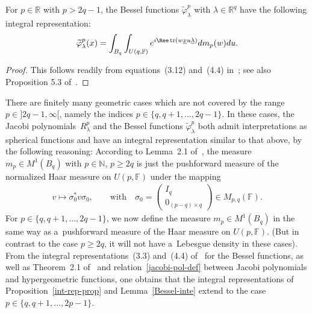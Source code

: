 \begin{Lemma}
\label{Bessel-inte}
For $p\in \mathbb R$ with $p>2q-1$, the Bessel functions $\widetilde\varphi_\lambda^{p}$ with $\lambda \in \mathbb R^q$
have the following integral representation:
\begin{gather}
\label{int-rep-Bessel}
\widetilde\varphi_\lambda^{p}(x)=\int_{B_q}\int_{U(q,\mathbb F)} e^{i\Ree \operatorname{tr}(w \underline x u \underline\lambda)}dm_p(w)du.
\end{gather}
\end{Lemma}

\begin{proof}
This follows readily from equations~(3.12) and~(4.4) in~\cite{R1}; see also Proposition 5.3 of~\cite{RV2}.
\end{proof}

\begin{Remark}
\label{group}
There are f\/initely many geometric cases which are not covered by the range $p\in{}]2q-1,\infty[$, namely the indices
$p\in\{q, q+1, \ldots, 2q-1\}$. In these cases, the Jacobi polyno\-mials~$R_\lambda^p $ and the Bessel functions
$\widetilde\varphi_\lambda^{p}$ both admit interpretations as spherical functions and have an integral representation
similar to that above, by the following reasoning: According to Lemma~2.1 of~\cite{R2}, the measure $m_p\in M^1(B_q)$
with $p\in \mathbb N$, $p\geq 2q$ is just the pushforward measure of the normalized Haar measure on $U(p,\mathbb F)$ under
the mapping
\begin{gather*}
v\mapsto \sigma_0^* v\sigma_0,
\qquad
\text{with}
\quad
\sigma_0=
\begin{pmatrix}
I_q
\\
0_{(p-q)\times q}
\end{pmatrix}
\in M_{p,q}(\mathbb F).
\end{gather*}
For $p\in \{q, q+1, \ldots, 2q-1\}$, we now def\/ine the measure $m_p\in M^1(B_q)$ in the same way as a~pushforward
measure of the Haar measure on $U(p, \mathbb F)$. (But in contrast to the case $p\geq 2q$, it will not have a~Lebesgue
density in these cases).
From the integral representa\-tions~(3.3) and~(4.4) of~\cite{R1} for the Bessel functions, as well as Theorem~2.1
of~\cite{RV2} and relation~\eqref{jacobi-pol-def} between Jacobi polynomials and hypergeometric functions, one obtains
that the integral representations of Proposition~\ref{int-rep-prop} and Lemma~\ref{Bessel-inte} extend
to the case $p\in\{q, q+1, \ldots, 2p-1\}$.
\end{Remark}

